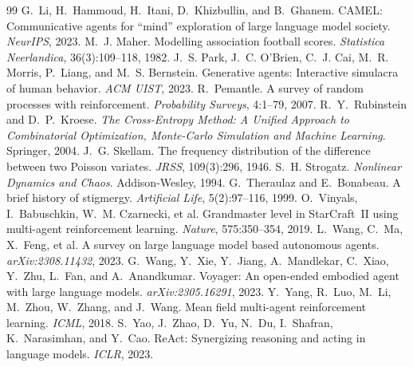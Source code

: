 \documentclass[11pt]{article}
\theoremstyle{definition}
\theoremstyle{remark}
\begin{document}
\begin{thebibliography}{99}
 G.~Li, H.~Hammoud, H.~Itani, D.~Khizbullin, and B.~Ghanem. CAMEL: Communicative agents for ``mind'' exploration of large language model society. \emph{NeurIPS}, 2023.
 M.~J. Maher. Modelling association football scores. \emph{Statistica Neerlandica}, 36(3):109--118, 1982.
 J.~S. Park, J.~C. O'Brien, C.~J. Cai, M.~R. Morris, P.~Liang, and M.~S. Bernstein. Generative agents: Interactive simulacra of human behavior. \emph{ACM UIST}, 2023.
 R.~Pemantle. A survey of random processes with reinforcement. \emph{Probability Surveys}, 4:1--79, 2007.
 R.~Y.~Rubinstein and D.~P.~Kroese. \emph{The Cross-Entropy Method: A Unified Approach to Combinatorial Optimization, Monte-Carlo Simulation and Machine Learning}. Springer, 2004.
 J.~G. Skellam. The frequency distribution of the difference between two Poisson variates. \emph{JRSS}, 109(3):296, 1946.
 S.~H. Strogatz. \emph{Nonlinear Dynamics and Chaos}. Addison-Wesley, 1994.
 G.~Theraulaz and E.~Bonabeau. A brief history of stigmergy. \emph{Artificial Life}, 5(2):97--116, 1999.
 O.~Vinyals, I.~Babuschkin, W.~M. Czarnecki, et al. Grandmaster level in StarCraft~II using multi-agent reinforcement learning. \emph{Nature}, 575:350--354, 2019.
 L.~Wang, C.~Ma, X.~Feng, et al. A survey on large language model based autonomous agents. \emph{arXiv:2308.11432}, 2023.
 G.~Wang, Y.~Xie, Y.~Jiang, A.~Mandlekar, C.~Xiao, Y.~Zhu, L.~Fan, and A.~Anandkumar. Voyager: An open-ended embodied agent with large language models. \emph{arXiv:2305.16291}, 2023.
 Y.~Yang, R.~Luo, M.~Li, M.~Zhou, W.~Zhang, and J.~Wang. Mean field multi-agent reinforcement learning. \emph{ICML}, 2018.
 S.~Yao, J.~Zhao, D.~Yu, N.~Du, I.~Shafran, K.~Narasimhan, and Y.~Cao. ReAct: Synergizing reasoning and acting in language models. \emph{ICLR}, 2023.
\end{thebibliography}
\end{document}
